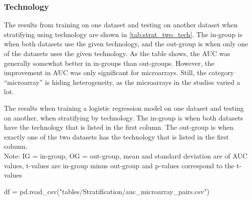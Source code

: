 {{{{{{{{{\subsubsection{Technology}
\label{subsubsec:res_strat_two_tech}
The results from training on one dataset and testing on another dataset when stratifying using technology are shown in \autoref{tab:strat_two_tech}. The in-group is when both datasets use the given technology, and the out-group is when only one of the datasets uses the given technology. As the table shows, the AUC was generally somewhat better in in-groups than out-groups. However, the improvement in AUC was only significant for microarrays. Still, the category ``microarray'' is hiding heterogeneity, as the microarrays in the studies varied a lot.


\begin{table}
    \caption{The results when training a logistic regression model on one dataset and testing on another, when stratifying by technology. The in-group is when both datasets have the technology that is listed in the first column. The out-group is when exactly one of the two datasets has the technology that is listed in the first column. \\
    Note: IG = in-group, OG = out-group, mean and standard deviation are of AUC values, t-values are in-group minus out-group and p-values correspond to the t-values}
    \label{tab:strat_two_tech}
\end{table}

\begin{pycode}
df = pd.read_csv("tables/Stratification/auc_microarray_pairs.csv")
\end{pycode}

}}}}}}}}}
